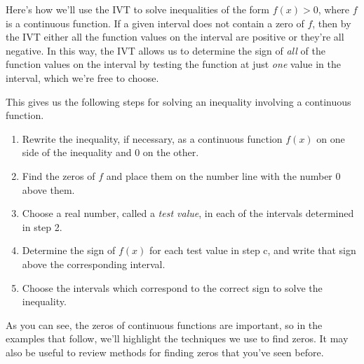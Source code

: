 \documentclass[noauthor, nooutcomes]{ximera}
\begin{document}
Here's how we'll use the IVT to solve inequalities of the form $f(x) > 0$, where $f$ is a continuous function. If a given interval does not contain a zero of $f$, then by the IVT either all the function values on the interval are positive or they're all negative. In this way, the IVT allows us to determine the sign of \emph{all} of the function values on the interval by testing the function at just \emph{one} value in the interval, which we're free to choose. 

This gives us the following steps for solving an inequality involving a continuous function.

\begin{enumerate}

\item  Rewrite the inequality, if necessary, as a continuous function $f(x)$ on one side of the inequality and $0$ on the other.

\item  Find the zeros of $f$ and place them on the number line with the number $0$ above them.

\item  Choose a real number, called a \emph{test value}, in each of the intervals determined in step 2. 

\item  Determine the sign of $f(x)$ for each test value in step c, and write that sign above the corresponding interval.

\item  Choose the intervals which correspond to the correct sign to solve the inequality.

\end{enumerate}

As you can see, the zeros of continuous functions are important, so in the examples that follow, we'll highlight the techniques we use to find zeros. It may also be useful to review methods for finding zeros that you've seen before.

\end{document}
